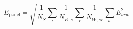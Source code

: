 \documentclass{article}
\begin{document}
\fontsize{22}{29}\selectfont
\[
E_{\mathrm{panel}}=\sqrt{\frac{1}{N_S}\sum_s\frac{1}{N_{R,s}}\sum_r\frac{1}{N_{W,sr}}\sum_w E_{srw}^2}
\]
\end{document}
